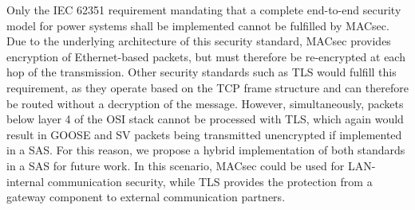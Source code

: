 \documentclass[conference, onecolumn, a4paper]{IEEEtran}
\begin{document}
\smallskip
Only the IEC 62351 requirement mandating that a complete end-to-end security model for power systems shall be implemented \cite{Review_IEC62351:2019} cannot 
be fulfilled by MACsec. Due to the underlying architecture of this security standard, MACsec provides encryption of Ethernet-based packets, but must therefore 
be re-encrypted at each hop of the transmission. Other security standards such as TLS would fulfill this requirement, as they operate based on the TCP 
frame structure and can therefore be routed without a decryption of the message. However, simultaneously, packets below layer 4 of the OSI stack cannot 
be processed with TLS, which again would result in GOOSE and SV packets being transmitted unencrypted if implemented in a SAS. For this reason, we propose 
a hybrid implementation of both standards in a SAS for future work. In this scenario, MACsec could be used for LAN-internal communication security, while 
TLS provides the protection from a gateway component to external communication partners.    

\printbibliography
\end{document}
